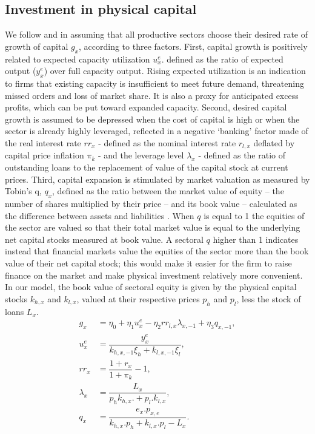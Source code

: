 \documentclass[authoryear]{article}
\begin{document}
\subsection{Investment in physical capital}
\label{sec:inv}

We follow \citet{Fazzari1986} and \citet{Caiani2014} in assuming that all productive sectors choose their desired rate of growth of capital $g_{x}$, according to three factors. First, capital growth is positively related to expected capacity utilization $u_x^e$. defined as the ratio of expected output ($y_x^e$) over full capacity output. Rising expected utilization is an indication to firms that existing capacity is insufficient to meet future demand, threatening missed orders and loss of market share. It is also a proxy for anticipated excess profits, which can be put toward expanded capacity. Second, desired capital growth is assumed to be depressed when the cost of capital is high or when the sector is already highly leveraged, reflected in a negative `banking' factor made of the real interest rate $rr_{x}$ - defined as the nominal interest rate $r_{l,x}$ deflated by capital price inflation $\pi_k$ - and the leverage level $\lambda_x$ - defined as the ratio of outstanding loans to the replacement of value of the capital stock at current prices. Third, capital expansion is stimulated by market valuation as measured by Tobin's q, $q_x$, defined as the ratio between the market value of equity – the number of shares multiplied by their price – and its book value – calculated as the difference between assets and liabilities \citep{Tobin1969}. When $q$ is equal to 1 the equities of the sector are valued so that their total market value is equal to the underlying net capital stocks measured at book value. A sectoral $q$ higher than 1 indicates instead that financial markets value the equities of the sector more than the book value of their net capital stock; this would make it easier for the firm to raise finance on the market and make physical investment relatively more convenient. In our model, the book value of sectoral equity is given by the physical capital stocks $k_{h,x}$ and $k_{l,x}$, valued at their respective prices $p_h$ and $p_l$, less the stock of loans $L_x$.
\begin{align}
g_{x}&=\eta_{0} + \eta_{1} u_x^e-\eta_{2} rr_{l,x} \lambda_{x,-1}+\eta_3 q_{x,-1}, \label{eq:gx}\\
u_x^e&=\dfrac{y_x^e}{k_{h, x,-1}\xi_h+k_{l, x,-1}\xi_l},\\
rr_x&=\dfrac{1+r_x}{1+\pi_k}-1,\\
\lambda_x&=\dfrac{L_x}{p_hk_{h,x}. +p_l.k_{l,x}},\\
q_x&=\dfrac{e_x.p_{x,e}}{k_{h,x}.p_h+k_{l,x}.p_l-L_x}.
\end{align}
\end{document}
